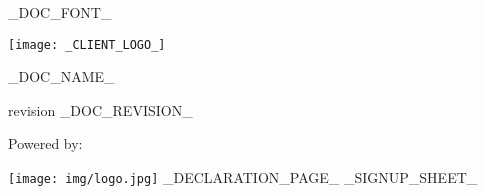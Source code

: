 _DOC_FONT_

\pagestyle{fancy}
\fancyfoot[C]{}
\fancyfoot[R]{\footnotesize \thepage}

\texttt{[image: \_CLIENT\_LOGO\_]}

\vspace{80pt}

\centerline{\Huge _DOC_NAME_}

\vspace{40pt}

\centerline{\large revision _DOC_REVISION_}

\vspace{80pt}

\centerline{\huge Powered by:}
\texttt{[image: img/logo.jpg]}
_DECLARATION_PAGE_
_SIGNUP_SHEET_
\newpage